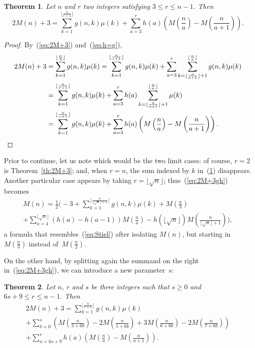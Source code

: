 \documentclass[10pt]{amsart}
\newtheorem{theor}{Theorem}
\begin{document}
\begin{theor}
\label{th:2M+3gh}
Let $n$ and $r$ two integers satisfying $3\leq r\leq n-1$. Then
\begin{equation}
\label{eq:2M+3gh}
2M(n)+3 = \sum_{k=1}^{\lfloor\frac{n}{r+1}\rfloor} g(n,k)\mu(k)
+ \sum_{a=3}^r h(a)\left(M\left(\frac na\right)
- M\left(\frac n{a+1}\right)\right).
\end{equation}
\end{theor}

\begin{proof}
By~(\ref{eq:2M+3}) and~(\ref{eq:h=g}),
\begin{align*}
2M(n)+3 &= \sum_{k=1}^{\lfloor\frac{n}{3}\rfloor} g(n,k)\mu(k)
= \sum_{k=1}^{\lfloor\frac{n}{r+1}\rfloor} g(n,k)\mu(k)
+ \sum_{a=3}^r \sum_{k=\lfloor \frac {n}{a+1}\rfloor+1}^{\lfloor
\frac na\rfloor} g(n,k)\mu(k)
\\
&= \sum_{k=1}^{\lfloor\frac{n}{r+1}\rfloor} g(n,k)\mu(k)
+ \sum_{a=3}^r h(a)\sum_{k=\lfloor \frac{n}{a+1}
\rfloor+1}^{\lfloor \frac na\rfloor}\mu(k)
\\
&= \sum_{k=1}^{\lfloor\frac{n}{r+1}\rfloor} g(n,k)\mu(k)
+ \sum_{a=3}^r h(a)\left(M\left(\frac na\right)
- M\left(\frac n{a+1}\right)\right).
\qedhere
\end{align*}
\end{proof}

Prior to continue, let us note which would be the two limit
cases: of course, $r=2$ is Theorem~\ref{th:2M+3}; and,
when $r=n$, the sum indexed by $k$ in~(\ref{th:2M+3gh}) disappears.
Another particular case appears by taking $r = \lfloor\sqrt{n}\rfloor$;
thus~(\ref{eq:2M+3gh}) becomes
\begin{multline*}
M(n) = \frac12 \Biggl( -3 
+ \sum_{k=1}^{\lfloor\frac{n}{\lfloor\sqrt{n}\rfloor+1}\rfloor} g(n,k)\mu(k)
+ M\left(\frac n3\right) \\
+ \sum_{a=4}^{\lfloor\sqrt{n}\rfloor} (h(a)-h(a-1)) M\left(\frac na\right) 
- h(\lfloor\sqrt{n}\rfloor) M\left(\frac n{\lfloor\sqrt{n}\rfloor+1}\right) 
\Biggr), 
\end{multline*}
a formula that resembles~(\ref{eq:Stiel}) after isolating $M(n)$, 
but starting in $M(\frac n3)$ instead of~$M(\frac n2)$.

On the other hand, by splitting again the summand on the right
in~(\ref{eq:2M+3gh}), we can introduce a new parameter~$s$:

\begin{theor}
\label{th:2M+3sr}
Let $n$, $r$ and $s$ be three integers such that $s \geq 0$ and
$6s+9\leq r\leq n-1$.
Then
\begin{multline*}
2M(n)+3 = \sum_{k=1}^{\lfloor\frac{n}{r+1}\rfloor} g(n,k)\mu(k) \\
+ \sum_{b=0}^s \left( M\left( \frac{n}{3+6b}\right)
- 2M\left( \frac{n}{5+6b}\right)
+ 3M\left( \frac{n}{6+6b}\right)
- 2M\left( \frac{n}{7+6b}\right)\right) \\
+ \sum_{a=6s+9}^r h(a)\left(M\left(\frac na\right)
- M\left(\frac n{a+1}\right)\right).
\end{multline*}
\end{theor}
\end{document}
